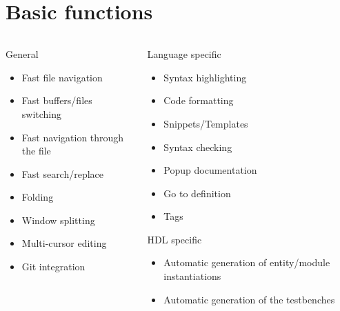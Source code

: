\documentclass[aspectratio=169]{beamer}
\begin{document}
\section*{Basic functions}
\begin{frame}{\secname}
  \begin{columns}
    \begin{column}{0.5\textwidth}
  \begin{block}{General}
    \begin{itemize}
        \item Fast file navigation
        \item Fast buffers/files switching
        \item Fast navigation through the file
        \item Fast search/replace
        \item Folding
        \item Window splitting
        \item Multi-cursor editing
        \item Git integration
    \end{itemize}
  \end{block}
      
    \end{column}


    \begin{column}{0.5\textwidth}

      \begin{block}{Language specific}
        \begin{itemize}
          \item Syntax highlighting
          \item Code formatting
          \item Snippets/Templates
          \item Syntax checking
          \item Popup documentation
          \item Go to definition
          \item Tags
        \end{itemize}
      \end{block}
      \begin{block}{HDL specific}
        \begin{itemize}
          \item Automatic generation of entity/module instantiations
          \item Automatic generation of the testbenches
        \end{itemize}
      \end{block}
      
    \end{column}
  \end{columns}
    
\end{frame}
\end{document}
